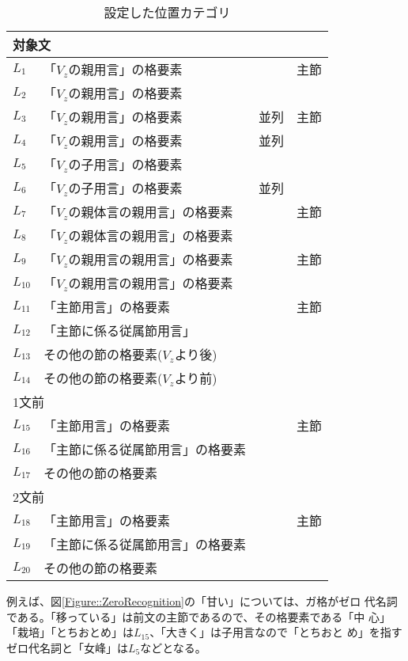 \documentclass{nlp}
\begin{document}
\begin{table}[t]
 \begin{center}
  \caption{設定した位置カテゴリ}
  \label{表::位置カテゴリ}
  \begin{tabular}{l@{: }lcc} \hline
   \multicolumn{4}{l}{対象文} \\ \hline
   $L_1$ & 「$V_z$の親用言」の格要素 & & 主節 \\
   $L_2$ & 「$V_z$の親用言」の格要素 & & \\
   $L_3$ & 「$V_z$の親用言」の格要素 & 並列 & 主節 \\
   $L_4$ & 「$V_z$の親用言」の格要素 & 並列 & \\
   $L_5$ & 「$V_z$の子用言」の格要素 & & \\
   $L_6$ & 「$V_z$の子用言」の格要素 & 並列 & \\
   $L_7$ & 「$V_z$の親体言の親用言」の格要素 & & 主節 \\
   $L_8$ & 「$V_z$の親体言の親用言」の格要素 & & \\
   $L_9$ & 「$V_z$の親用言の親用言」の格要素 & & 主節 \\
   $L_{10}$ & 「$V_z$の親用言の親用言」の格要素 & & \\
   $L_{11}$ & 「主節用言」の格要素 & & 主節 \\
   $L_{12}$ & 「主節に係る従属節用言」 & & \\
   $L_{13}$ & その他の節の格要素($V_z$より後) & & \\
   $L_{14}$ & その他の節の格要素($V_z$より前) & & \\ \hline
   \multicolumn{4}{l}{1文前} \\ \hline
   $L_{15}$ & 「主節用言」の格要素 & & 主節 \\
   $L_{16}$ & 「主節に係る従属節用言」の格要素 & & \\
   $L_{17}$ & その他の節の格要素 & & \\ \hline
   \multicolumn{4}{l}{2文前} \\ \hline
   $L_{18}$ & 「主節用言」の格要素 & & 主節 \\
   $L_{19}$ & 「主節に係る従属節用言」の格要素 & & \\
   $L_{20}$ & その他の節の格要素 & & \\ \hline
  \end{tabular}
 \end{center}
\end{table}

例えば、図\ref{Figure::ZeroRecognition}の「甘い」については、ガ格がゼロ
代名詞である。「移っている」は前文の主節であるので、その格要素である「中
心」「栽培」「とちおとめ」は$L_{15}$、「大きく」は子用言なので「とちおと
め」を指すゼロ代名詞と「女峰」は$L_5$などとなる。
\end{document}
